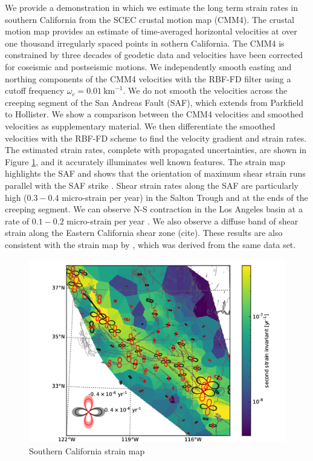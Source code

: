 \documentclass[10pt,a4paper]{article}
\begin{document}
We provide a demonstration in which we estimate the long term strain rates in southern California from the SCEC crustal motion map (CMM4)\citep{Shen2011}.  The crustal motion map provides an estimate of time-averaged horizontal velocities at over one thousand irregularly spaced points in sothern California.  The CMM4 is constrained by three decades of geodetic data and velocities have been corrected for coseismic and postseismic motions.  We independently smooth easting and northing components of the CMM4 velocities with the RBF-FD filter using a cutoff frequency $\omega_c=0.01\ \mathrm{km}^{-1}$. We do not smooth the velocities across the creeping segment of the San Andreas Fault (SAF), which extends from Parkfield to Hollister.  We show a comparison between the CMM4 velocities and smoothed velocities as supplementary material. We then differentiate the smoothed velocities with the RBF-FD scheme to find the velocity gradient and strain rates.  The estimated strain rates, complete with propagated uncertainties, are shown in Figure \ref{fig:SoCal1}, and it accurately illuminates well known features.  The strain map highlights the SAF and shows that the orientation of maximum shear strain runs parallel with the SAF strike \citep{Lisowski1991}.  Shear strain rates along the SAF are particularly high ($0.3-0.4$ micro-strain per year) in the Salton Trough and at the ends of the creeping segment. We can observe N-S contraction in the Los Angeles basin at a rate of $0.1-0.2$ micro-strain per year \citep{Shen1996,Argus1999,Argus2005}. We also observe a diffuse band of shear strain along the Eastern California shear zone (cite). These results are also consistent with the strain map by \citet{Shen2015}, which was derived from the same data set. 

\begin{figure}
\includegraphics[scale=1.0]{figures/figure5.png}
\caption{Southern California strain map}   
\label{fig:SoCal1}
\end{figure}
\end{document}
